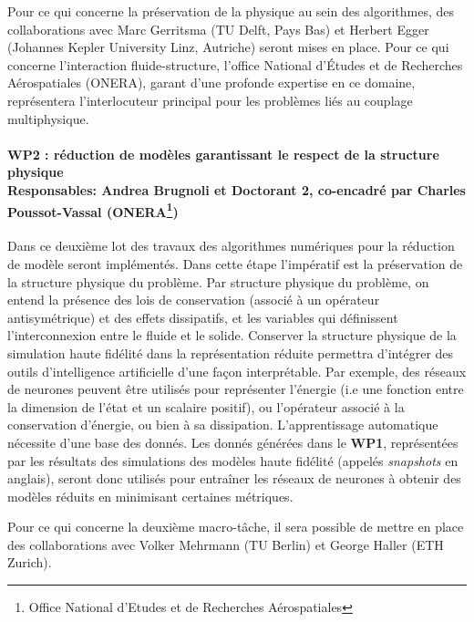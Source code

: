 \documentclass[12pt, french]{article}
\begin{document}
	Pour ce qui concerne la préservation de la physique au sein des algorithmes, des collaborations avec Marc Gerritsma (TU Delft, Pays Bas) et Herbert Egger (Johannes Kepler University Linz, Autriche) seront mises en place. Pour ce qui concerne l'interaction fluide-structure, l'office National d'Études et de Recherches Aérospatiales (ONERA), garant d'une profonde expertise en ce domaine, représentera l'interlocuteur principal pour les problèmes liés au couplage multiphysique.
	
	\paragraph[\large WP2 : réduction de modèles garantissant le respect de la structure physique\\
	Responsables: Andrea Brugnoli et Doctorant 2, co-encadré par Charles Poussot-Vassal (ONERA)]{\large WP2 : réduction de modèles garantissant le respect de la structure physique\\
		Responsables: Andrea Brugnoli et Doctorant 2, co-encadré par Charles Poussot-Vassal (ONERA\footnote{Office National d'Etudes et de Recherches Aérospatiales})\\}
	
	Dans ce deuxième lot des travaux des algorithmes numériques pour la réduction de modèle seront implémentés. Dans cette étape l'impératif est la préservation de la structure physique du problème. 	Par structure physique du problème, on entend la présence des lois de conservation (associé à un opérateur antisymétrique) et des effets dissipatifs, et les variables qui définissent l'interconnexion entre le fluide et le solide. Conserver la structure physique de la simulation haute fidélité dans la représentation réduite permettra d'intégrer des outils d'intelligence artificielle d'une façon interprétable. Par exemple, des réseaux de neurones peuvent être utilisés pour représenter l'énergie (i.e une fonction entre la dimension de l'état et un scalaire positif), ou l'opérateur associé à la conservation d'énergie, ou bien à sa dissipation. L'apprentissage automatique nécessite d'une base des donnés. Les donnés générées dans le \textbf{WP1}, représentées par les résultats des simulations des modèles haute fidélité (appelés \textit{snapshots} en anglais), seront donc utilisés pour entraîner les réseaux de neurones à obtenir des modèles réduits en minimisant certaines métriques.
	
	Pour ce qui concerne la deuxième macro-tâche, il sera possible de mettre en place des collaborations avec Volker Mehrmann (TU Berlin) et George Haller (ETH Zurich).
	
\end{document}
